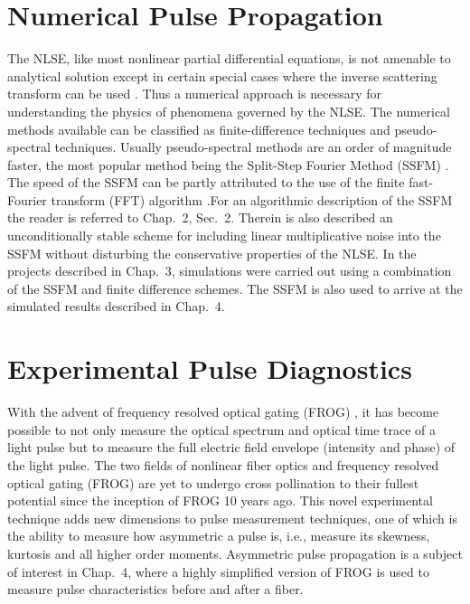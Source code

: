 \section{Numerical Pulse Propagation}

The NLSE, like most nonlinear partial differential equations, is not
amenable to analytical solution except in certain special cases where the
inverse scattering transform can be used \cite{Zakharov}. Thus a
numerical approach is necessary for understanding the physics of phenomena
governed by the NLSE. The numerical methods available can be classified as
finite-difference techniques and pseudo-spectral techniques. Usually
pseudo-spectral methods are an order of magnitude faster, the most
popular method being the Split-Step Fourier Method (SSFM) \cite{Agrawal2,Hardin,
Fisher}. The speed of the SSFM can be partly attributed to the use
of the finite fast-Fourier transform (FFT) algorithm
\cite{Cooley}.For an algorithmic description of the SSFM the reader is
referred to Chap.\ 2, Sec.\ 2. Therein is also described an
unconditionally stable scheme for including linear multiplicative noise into
the SSFM without disturbing the conservative properties of the NLSE. In the
projects described in Chap.\ 3, simulations were carried out using a
combination of the SSFM and finite difference schemes. The SSFM is also used 
 to arrive at the simulated results described in Chap.\ 4.

\section{Experimental Pulse Diagnostics}

With the advent of frequency resolved optical gating
(FROG) \cite{Trebino,Kanejqe,Kaneoptlett}, it has become possible to not
only measure the optical spectrum and optical time trace of a light pulse
but to measure the full electric field envelope (intensity and phase) of the
light pulse. The two fields of nonlinear fiber optics and frequency resolved
optical gating (FROG) are yet to undergo cross pollination to their fullest
potential since the inception of FROG 10 years ago. This novel experimental
technique adds new dimensions to pulse measurement techniques, one of which
is the ability to measure how asymmetric a pulse is, i.e., measure its
skewness, kurtosis and all higher order moments. Asymmetric pulse
propagation is a subject of interest in Chap.\ 4, where a highly simplified
version of FROG \cite{OShealett} is used to measure pulse characteristics
before and after a fiber.

